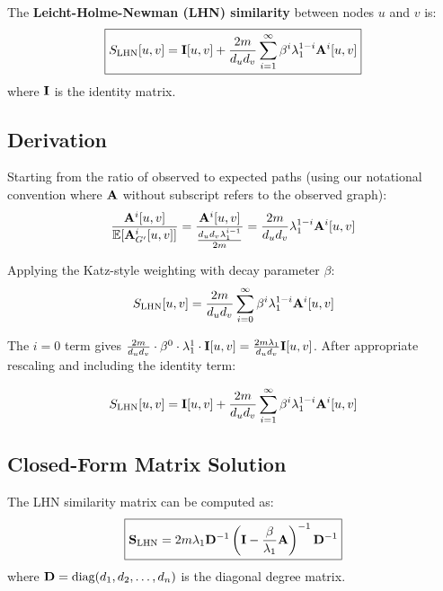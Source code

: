 \begin{notechapter}
\begin{definition}
The \textbf{Leicht-Holme-Newman (LHN) similarity} between nodes $u$ and $v$ is:
\begin{equation}
\boxed{
S_{\text{LHN}}[u,v] = \mathbf{I}[u,v] + \frac{2m}{d_u d_v} \sum_{i=1}^{\infty} \beta^i \lambda_1^{1-i} \mathbf{A}^i[u,v]
}
\label{lhn-similarity:eq:lhn-definition}
\end{equation}
where $\mathbf{I}$ is the identity matrix.
\end{definition}

\subsection{Derivation}

Starting from the ratio of observed to expected paths (using our notational convention where $\mathbf{A}$ without subscript refers to the observed graph):
\[
\frac{\mathbf{A}^i[u,v]}{\mathbb{E}[\mathbf{A}_{G'}^i[u,v]]} = \frac{\mathbf{A}^i[u,v]}{\frac{d_u d_v \lambda_1^{i-1}}{2m}} = \frac{2m}{d_u d_v} \lambda_1^{1-i} \mathbf{A}^i[u,v]
\]

Applying the Katz-style weighting with decay parameter $\beta$:
\[
S_{\text{LHN}}[u,v] = \frac{2m}{d_u d_v} \sum_{i=0}^{\infty} \beta^i \lambda_1^{1-i} \mathbf{A}^i[u,v]
\]

The $i=0$ term gives $\frac{2m}{d_u d_v} \cdot \beta^0 \cdot \lambda_1^1 \cdot \mathbf{I}[u,v] = \frac{2m\lambda_1}{d_u d_v}\mathbf{I}[u,v]$. After appropriate rescaling and including the identity term:

\begin{equation}
S_{\text{LHN}}[u,v] = \mathbf{I}[u,v] + \frac{2m}{d_u d_v} \sum_{i=1}^{\infty} \beta^i \lambda_1^{1-i} \mathbf{A}^i[u,v]
\end{equation}

\subsection{Closed-Form Matrix Solution}

\begin{theorem}
The LHN similarity matrix can be computed as:
\begin{equation}
\boxed{
\mathbf{S}_{\text{LHN}} = 2 m \lambda_1 \mathbf{D}^{-1} \left(\mathbf{I} - \frac{\beta}{\lambda_1}\mathbf{A}\right)^{-1} \mathbf{D}^{-1}
}
\label{lhn-similarity:eq:lhn-closed}
\end{equation}
where $\mathbf{D} = \text{diag}(d_1, d_2, \ldots, d_n)$ is the diagonal degree matrix.
\end{theorem}


\end{notechapter}
